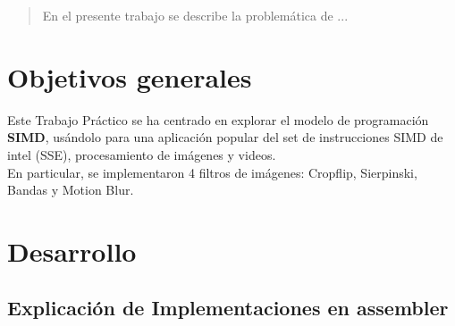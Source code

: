 \documentclass[a4paper]{article}
\begin{document}
\thispagestyle{empty}

\maketitle
\newpage

\thispagestyle{empty}
\vfill
\begin{abstract}
En el presente trabajo se describe la problemática de ...
\end{abstract}

\thispagestyle{empty}
\vspace{3cm}
\tableofcontents
\newpage


\newpage

\section{Objetivos generales}

Este Trabajo Pr\'{a}ctico se ha centrado en explorar el modelo de programaci\'{o}n \textbf{SIMD}, us\'{a}ndolo para una aplicaci\'{o}n popular del set de instrucciones SIMD de intel (SSE), procesamiento de im\'{a}genes y videos.\\
En particular, se implementaron 4 filtros de im\'{a}genes: Cropflip, Sierpinski, Bandas y Motion Blur.\\


\section{Desarrollo}

\subsection{Explicaci\'{o}n de Implementaciones en assembler}
\end{document}
